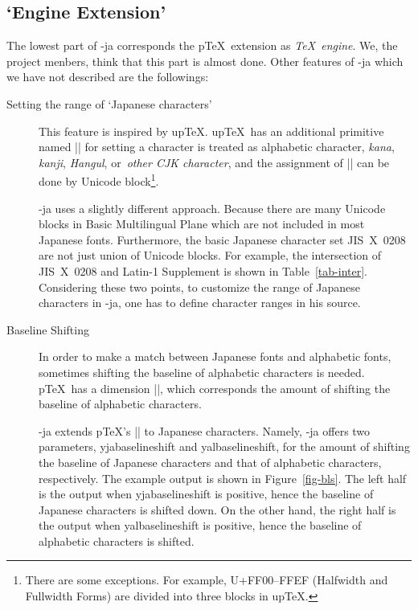 \documentclass{ajt}
\begin{document}
\subsection{`Engine Extension'}
The lowest part of \LuaTeX-ja corresponds the p\TeX\ extension as
\emph{\TeX\ engine}. We, the project menbers, think that this part is almost
done. Other features of \LuaTeX-ja which we have not described are the
followings:
\begin{description}
\item[Setting the range of `Japanese characters'] This feature is
	   inspired by up\TeX. up\TeX\ has an additional primitive named
	   |\kcatcode| for setting a character is treated as alphabetic
	   character, \emph{kana}, \emph{kanji}, \emph{Hangul},
	   or~\emph{other CJK character}, and the assignment of
	   |\kcatcode| can be done by Unicode block\footnote{There
	   are some exceptions. For example, U+FF00--FFEF (Halfwidth and
	   Fullwidth Forms) are divided into three blocks in up\TeX.}.

\LuaTeX-ja uses a slightly different approach. Because there are many
	   Unicode blocks in Basic Multilingual Plane which are not
	   included in most Japanese fonts.  Furthermore, the basic
	   Japanese character set JIS~X~0208 are not just union of
	   Unicode blocks. For example, the intersection of JIS~X~0208
	   and Latin-1 Supplement is shown in Table~\ref{tab-inter}.
	   Considering these two points, to customize the range of
	   Japanese characters in \LuaTeX-ja, one has to define
	   character ranges in his source.

\item[Baseline Shifting]
In order to make a match between Japanese fonts and alphabetic fonts,
	   sometimes shifting the baseline of alphabetic characters is
	   needed. p\TeX\ has a dimension |\ybaselineshift|, which
	   corresponds the amount of shifting the baseline of alphabetic
	   characters. 

\LuaTeX-ja extends p\TeX's |\ybaselineshift| to Japanese
	   characters. Namely, \LuaTeX-ja offers two parameters,
	   \textsf{yjabaselineshift} and \textsf{yalbaselineshift}, for the
	   amount of shifting the baseline of Japanese characters and
	   that of alphabetic characters, respectively. The example
	   output is shown in Figure~\ref{fig-bls}. The left half is the
	   output when \textsf{yjabaselineshift} is positive, hence the
	   baseline of Japanese characters is shifted down. On the other
	   hand, the right half is the output when
	   \textsf{yalbaselineshift} is positive, hence the baseline of
	   alphabetic characters is shifted.


\end{description}
\end{document}

